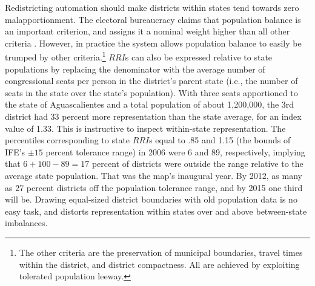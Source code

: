 \documentclass[letter,12pt]{article}
\begin{document}
Redistricting automation should make districts within states tend towards zero malapportionment. The electoral bureaucracy claims that population balance is an important criterion, and assigns it a nominal weight higher than all other criteria \citep{altman.magar.mcd.trelles2014apsa}. However, in practice the system allows population balance to easily be trumped by other criteria.\footnote{The other criteria are the preservation of municipal boundaries, travel times within the district, and district compactness. All are achieved by exploiting tolerated population leeway.} $RRI$s can also be expressed relative to state populations by replacing the denominator with the average number of congressional seats per person in the district's parent state (i.e., the number of seats in the state over the state's population). With three seats apportioned to the state of Aguascalientes and a total population of about 1,200,000, the 3rd district had 33 percent more representation than the state average, for an index value of 1.33. This is instructive to inspect within-state representation. The percentiles corresponding to state $RRI$s equal to .85 and 1.15 (the bounds of IFE's $\pm15$ percent tolerance range) in 2006 were 6 and 89, respectively, implying that $6+100-89=17$ percent of districts were outside the range relative to the average state population. That was the map's inaugural year. By 2012, as many as 27 percent districts off the population tolerance range, and by 2015 one third will be. Drawing equal-sized district boundaries with old population data is no easy task, and distorts representation within states over and above between-state imbalances.  
\end{document}
